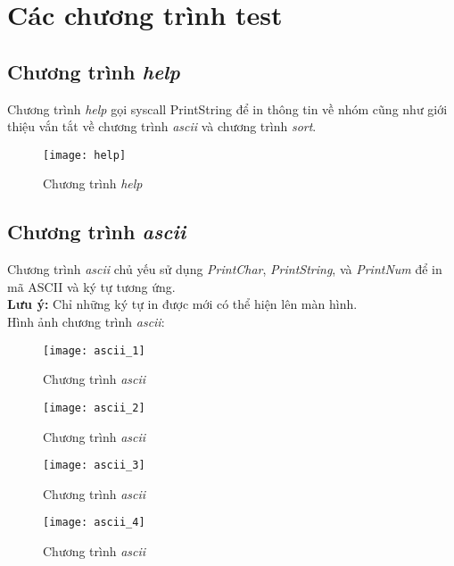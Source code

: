\section{Các chương trình test}
\subsection{Chương trình \textit{help}}
Chương trình \textit{help} gọi syscall PrintString để in thông tin về nhóm cũng như giới thiệu vắn tắt về chương trình \textit{ascii} và chương trình \textit{sort}.
\begin{figure}[H]
\begin{center}
\texttt{[image: help]}
\end{center}
\caption{Chương trình \textit{help}}
\end{figure}

\subsection{Chương trình \textit{ascii}}
Chương trình \textit{ascii} chủ yếu sử dụng \textit{PrintChar}, \textit{PrintString}, và \textit{PrintNum} để in mã ASCII và ký tự tương ứng.\\
\textbf{Lưu ý:} Chỉ những ký tự in được mới có thể hiện lên màn hình.\\
Hình ảnh chương trình \textit{ascii}:
\begin{figure}[H]
\begin{center}
\texttt{[image: ascii\_1]}
\end{center}
\caption{Chương trình \textit{ascii}}
\end{figure}

\begin{figure}[H]
\begin{center}
\texttt{[image: ascii\_2]}
\end{center}
\caption{Chương trình \textit{ascii}}
\end{figure}

\begin{figure}[H]
\begin{center}
\texttt{[image: ascii\_3]}
\end{center}
\caption{Chương trình \textit{ascii}}
\end{figure}

\begin{figure}[H]
\begin{center}
\texttt{[image: ascii\_4]}
\end{center}
\caption{Chương trình \textit{ascii}}
\end{figure}

